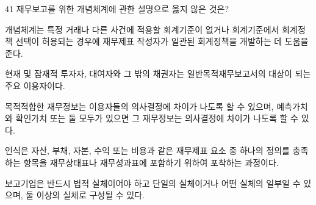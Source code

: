 \begin{question}{41}
재무보고를 위한 개념체계에 관한 설명으로 옳지 않은 것은?
\begin{choices}
  \item 개념체계는 특정 거래나 다른 사건에 적용할 회계기준이 없거나 회계기준에서 회계정책 선택이 허용되는 경우에 재무제표 작성자가 일관된 회계정책을 개발하는 데 도움을 준다.
  \item 현재 및 잠재적 투자자, 대여자와 그 밖의 채권자는 일반목적재무보고서의 대상이 되는 주요 이용자이다.
  \item 목적적합한 재무정보는 이용자들의 의사결정에 차이가 나도록 할 수 있으며, 예측가치와 확인가치 또는 둘 모두가 있으면 그 재무정보는 의사결정에 차이가 나도록 할 수 있다.
  \item 인식은 자산, 부채, 자본, 수익 또는 비용과 같은 재무제표 요소 중 하나의 정의를 충족하는 항목을 재무상태표나 재무성과표에 포함하기 위하여 포착하는 과정이다.
  \item 보고기업은 반드시 법적 실체이어야 하고 단일의 실체이거나 어떤 실체의 일부일 수 있으며, 둘 이상의 실체로 구성될 수 있다.
\end{choices}
\end{question}
